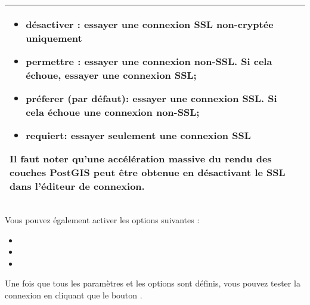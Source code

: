 \begin{table}[ht]
\begin{tabular}{|l|p{5in}|}
\begin {itemize}
\item désactiver : essayer une connexion SSL non-cryptée uniquement
\item permettre : essayer une connexion non-SSL. Si cela échoue, essayer une connexion SSL;
\item préferer (par défaut): essayer une connexion SSL. Si cela échoue une connexion non-SSL;
\item requiert: essayer seulement une connexion SSL
\end {itemize}
Il faut noter qu'une accélération massive du rendu des couches PostGIS peut être obtenue en désactivant le SSL dans l'éditeur de connexion. \\
\hline
\hline
\end{tabular}
\end{table}

Vous pouvez également activer les options suivantes :

\begin{itemize}
\item {}
\item {}
\item {}
\end{itemize}

Une fois que tous les paramètres et les options sont définis, vous pouvez tester la connexion en cliquant que le bouton  .

